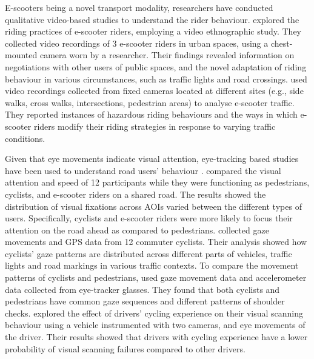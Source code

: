 E-scooters being a novel transport modality, researchers have conducted qualitative video-based studies to understand the rider behaviour. \citet{10.1145/3313831.3376499} explored the riding practices of e-scooter riders, employing a video ethnographic study. They collected video recordings of 3 e-scooter riders in urban spaces, using a chest-mounted camera worn by a researcher. Their findings revealed information on negotiations with other users of public spaces, and the novel adaptation of riding behaviour in various circumstances, such as traffic lights and road crossings. \citet{hong2022evaluation} used video recordings collected from fixed cameras located at different sites (e.g., side walks, cross walks, intersections, pedestrian areas) to analyse e-scooter traffic. They reported instances of hazardous riding behaviours and the ways in which e-scooter riders modify their riding strategies in response to varying traffic conditions.

Given that eye movements indicate visual attention, eye-tracking based studies have been used to understand road users' behaviour \cite{10.1145/3607822.3614532}. \citet{visualAttenstionTobii} compared the visual attention and speed of 12 participants while they were functioning as pedestrians, cyclists, and e-scooter riders on a shared road. The results showed the distribution of visual fixations across AOIs varied between the different types of users. Specifically, cyclists and e-scooter riders were more likely to focus their attention on the road ahead as compared to pedestrians. \citet{10.1145/3544548.3581049} collected gaze movements and GPS data from 12 commuter cyclists. Their analysis showed how cyclists' gaze patterns are distributed across different parts of vehicles, traffic lights and road markings in various traffic contexts. To compare the movement patterns of cyclists and pedestrians, \citet{10.1145/3204493.3214307} used gaze movement data and accelerometer data collected from eye-tracker glasses. They found that both cyclists and pedestrians have common gaze sequences and different patterns of shoulder checks. \citet{KAYA2021106380} explored the effect of drivers’ cycling experience on their visual scanning behaviour using a vehicle instrumented with two cameras, and eye movements of the driver. Their results showed that drivers with cycling experience have a lower probability of visual scanning failures compared to other drivers.

